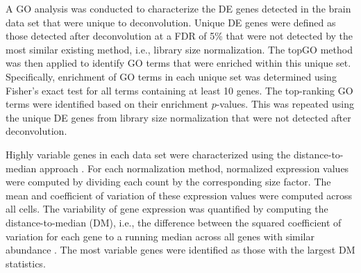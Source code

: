 \documentclass{bmcart}
\begin{document}

A GO analysis was conducted to characterize the DE genes detected in the brain data set that were unique to deconvolution.
Unique DE genes were defined as those detected after deconvolution at a FDR of 5\% that were not detected by the most similar existing method, i.e., library size normalization.
The topGO method \cite{alexa2010topgo} was then applied to identify GO terms that were enriched within this unique set.
Specifically, enrichment of GO terms in each unique set was determined using Fisher's exact test for all terms containing at least 10 genes.
The top-ranking GO terms were identified based on their enrichment $p$-values.
This was repeated using the unique DE genes from library size normalization that were not detected after deconvolution.

Highly variable genes in each data set were characterized using the distance-to-median approach \cite{kolod2015single}.
For each normalization method, normalized expression values were computed by dividing each count by the corresponding size factor.
The mean and coefficient of variation of these expression values were computed across all cells.
The variability of gene expression was quantified by computing the distance-to-median (DM), i.e., the difference between the squared coefficient of variation for each gene to a running median across all genes with similar abundance \cite{kolod2015single}. 
The most variable genes were identified as those with the largest DM statistics.

\end{document}
